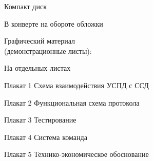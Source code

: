 


 
 
 
 
 \newpage
 \tableofcontents
 \vspace{1cm}
 \begin{minipage}[left]{0.6\linewidth}
  Компакт диск
 \end{minipage}
 \hfill
 \begin{minipage}[right]{0.3\linewidth}
  В конверте на обороте обложки 
 \end{minipage}
 
 \vspace{1cm}
 
 \begin{minipage}[left]{0.6\linewidth}
  Графический материал \\ (демонстрационные листы):
 \end{minipage}
 \hfill
 \begin{minipage}[right]{0.3\linewidth}
  На отдельных листах
 \end{minipage}
 
 \vspace{1cm}
 
 Плакат 1 Схема взаимодействия УСПД с ССД
 
 Плакат 2 Функциональная схема протокола

 Плакат 3 Тестирование
 
 Плакат 4 Система команда 
 
 Плакат 5 Технико-экономическое обоснование
 
 
 
 
 
 
 \newpage
 \renewcommand{\refname}{\hfill Список использованных источников \hfill}
 
 
 
 


